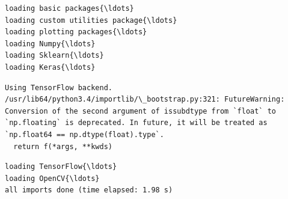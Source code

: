 \documentclass[11pt]{article}
\begin{document}
    \begin{Verbatim}[commandchars=\\\{\}]
loading basic packages{\ldots}
loading custom utilities package{\ldots}
loading plotting packages{\ldots}
loading Numpy{\ldots}
loading Sklearn{\ldots}
loading Keras{\ldots}

    \end{Verbatim}

    \begin{Verbatim}[commandchars=\\\{\}]
Using TensorFlow backend.
/usr/lib64/python3.4/importlib/\_bootstrap.py:321: FutureWarning: Conversion of the second argument of issubdtype from `float` to `np.floating` is deprecated. In future, it will be treated as `np.float64 == np.dtype(float).type`.
  return f(*args, **kwds)

    \end{Verbatim}

    \begin{Verbatim}[commandchars=\\\{\}]
loading TensorFlow{\ldots}
loading OpenCV{\ldots}
all imports done (time elapsed: 1.98 s)

    \end{Verbatim}
\end{document}
